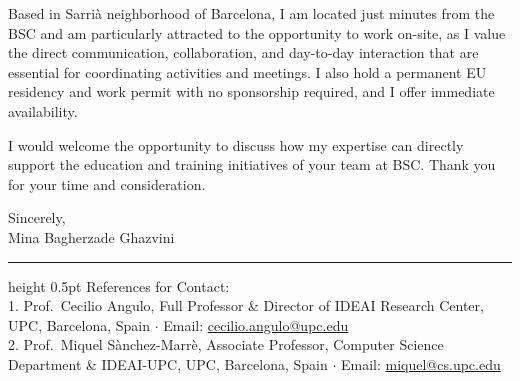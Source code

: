 \documentclass[11pt,a4paper]{article}
\begin{document}
Based in Sarrià neighborhood of Barcelona, I am located just minutes from the BSC and am particularly attracted to the opportunity to work on-site, as I value the direct communication, collaboration, and day-to-day interaction that are essential for coordinating activities and meetings. I also hold a permanent EU residency and work permit with no sponsorship required, and I offer immediate availability.

I would welcome the opportunity to discuss how my expertise can directly support the education and training initiatives of your team at BSC. Thank you for your time and consideration.

\vspace{4mm}
Sincerely, \\[4pt]
Mina Bagherzade Ghazvini

\vspace{6mm}
\hrule height 0.5pt
\vspace{2mm}
{\small References for Contact:} \\
{\footnotesize
1. Prof.~Cecilio Angulo, Full Professor \& Director of IDEAI Research Center, UPC, Barcelona, Spain $\cdot$ Email: \href{mailto:cecilio.angulo@upc.edu}{cecilio.angulo@upc.edu} \\
2. Prof.~Miquel S\`anchez-Marr\`e, Associate Professor, Computer Science Department \& IDEAI-UPC, UPC, Barcelona, Spain $\cdot$ Email: \href{mailto:miquel@cs.upc.edu}{miquel@cs.upc.edu}
}
\end{document}
